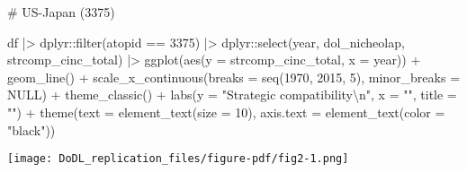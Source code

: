 \documentclass[
  12,
  letterpaper,
  DIV=11,
  numbers=noendperiod]{scrartcl}
\newenvironment{Shaded}{\begin{snugshade}}{\end{snugshade}}
\newcommand{\AttributeTok}[1]{\textcolor[rgb]{0.40,0.45,0.13}{#1}}
\newcommand{\CommentTok}[1]{\textcolor[rgb]{0.37,0.37,0.37}{#1}}
\newcommand{\ConstantTok}[1]{\textcolor[rgb]{0.56,0.35,0.01}{#1}}
\newcommand{\DecValTok}[1]{\textcolor[rgb]{0.68,0.00,0.00}{#1}}
\newcommand{\FunctionTok}[1]{\textcolor[rgb]{0.28,0.35,0.67}{#1}}
\newcommand{\NormalTok}[1]{\textcolor[rgb]{0.00,0.23,0.31}{#1}}
\newcommand{\SpecialCharTok}[1]{\textcolor[rgb]{0.37,0.37,0.37}{#1}}
\newcommand{\StringTok}[1]{\textcolor[rgb]{0.13,0.47,0.30}{#1}}
\begin{document}
\begin{Shaded}
\begin{Highlighting}[numbers=left,,]
\CommentTok{\# US{-}Japan (3375)}

\NormalTok{df }\SpecialCharTok{|\textgreater{}}
\NormalTok{  dplyr}\SpecialCharTok{::}\FunctionTok{filter}\NormalTok{(atopid }\SpecialCharTok{==} \DecValTok{3375}\NormalTok{) }\SpecialCharTok{|\textgreater{}}
\NormalTok{  dplyr}\SpecialCharTok{::}\FunctionTok{select}\NormalTok{(year, dol\_nicheolap, strcomp\_cinc\_total) }\SpecialCharTok{|\textgreater{}}
  \FunctionTok{ggplot}\NormalTok{(}\FunctionTok{aes}\NormalTok{(}\AttributeTok{y =}\NormalTok{ strcomp\_cinc\_total, }\AttributeTok{x =}\NormalTok{ year)) }\SpecialCharTok{+}
  \FunctionTok{geom\_line}\NormalTok{() }\SpecialCharTok{+}
  \FunctionTok{scale\_x\_continuous}\NormalTok{(}\AttributeTok{breaks =} \FunctionTok{seq}\NormalTok{(}\DecValTok{1970}\NormalTok{, }\DecValTok{2015}\NormalTok{, }\DecValTok{5}\NormalTok{), }\AttributeTok{minor\_breaks =} \ConstantTok{NULL}\NormalTok{) }\SpecialCharTok{+}
  \FunctionTok{theme\_classic}\NormalTok{() }\SpecialCharTok{+}
  \FunctionTok{labs}\NormalTok{(}\AttributeTok{y =} \StringTok{"Strategic compatibility}\SpecialCharTok{\textbackslash{}n}\StringTok{"}\NormalTok{,}
       \AttributeTok{x =} \StringTok{""}\NormalTok{,}
       \AttributeTok{title =} \StringTok{""}\NormalTok{) }\SpecialCharTok{+}
  \FunctionTok{theme}\NormalTok{(}\AttributeTok{text =} \FunctionTok{element\_text}\NormalTok{(}\AttributeTok{size =} \DecValTok{10}\NormalTok{),}
        \AttributeTok{axis.text =} \FunctionTok{element\_text}\NormalTok{(}\AttributeTok{color =} \StringTok{"black"}\NormalTok{))}
\end{Highlighting}
\end{Shaded}

\texttt{[image: DoDL\_replication\_files/figure-pdf/fig2-1.png]}
\end{document}
